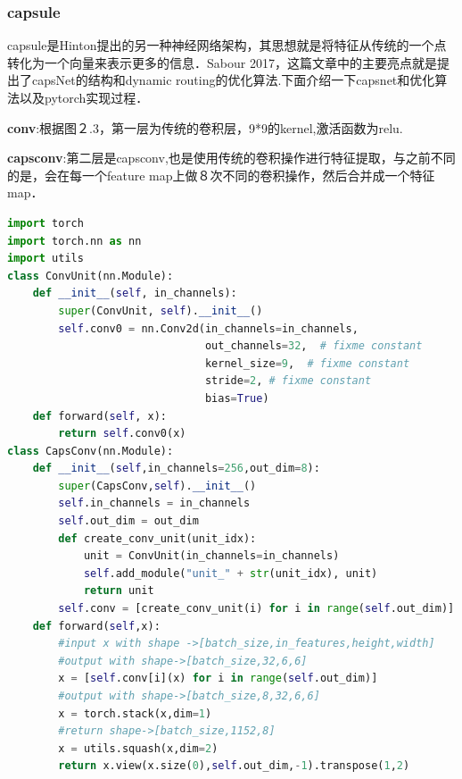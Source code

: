 \documentclass{article}
\begin{document}
\subsubsection{capsule}
capsule是Hinton提出的另一种神经网络架构，其思想就是将特征从传统的一个点转化为一个向量来表示更多的信息．Sabour 2017\cite{sabour2017dynamic}，这篇文章中的主要亮点就是提出了capsNet的结构和dynamic routing的优化算法.下面介绍一下capsnet和优化算法以及pytorch实现过程．

\textbf{conv}:根据图２.3，第一层为传统的卷积层，9*9的kernel,激活函数为relu.

\textbf{capsconv}:第二层是capsconv,也是使用传统的卷积操作进行特征提取，与之前不同的是，会在每一个feature map上做８次不同的卷积操作，然后合并成一个特征map．
\begin{lstlisting}[language=Python]
import torch
import torch.nn as nn
import utils
class ConvUnit(nn.Module):
	def __init__(self, in_channels):
        super(ConvUnit, self).__init__()
        self.conv0 = nn.Conv2d(in_channels=in_channels,
                               out_channels=32,  # fixme constant
                               kernel_size=9,  # fixme constant
                               stride=2, # fixme constant
                               bias=True)
    def forward(self, x):
        return self.conv0(x)
class CapsConv(nn.Module):
    def __init__(self,in_channels=256,out_dim=8):
        super(CapsConv,self).__init__()
        self.in_channels = in_channels
        self.out_dim = out_dim
        def create_conv_unit(unit_idx):
            unit = ConvUnit(in_channels=in_channels)
            self.add_module("unit_" + str(unit_idx), unit)
            return unit
        self.conv = [create_conv_unit(i) for i in range(self.out_dim)]
    def forward(self,x):
        #input x with shape ->[batch_size,in_features,height,width]
        #output with shape->[batch_size,32,6,6]
        x = [self.conv[i](x) for i in range(self.out_dim)]
        #output with shape->[batch_size,8,32,6,6]
        x = torch.stack(x,dim=1)
        #return shape->[batch_size,1152,8]
        x = utils.squash(x,dim=2)
        return x.view(x.size(0),self.out_dim,-1).transpose(1,2)
\end{lstlisting}
\end{document}
